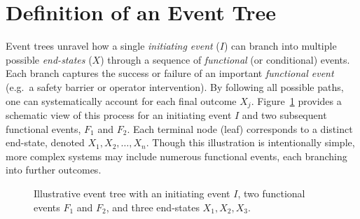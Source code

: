 \section{Definition of an Event Tree}
\label{sec:event_tree_definition}

Event trees unravel how a single \emph{initiating event} (\(I\)) can branch into multiple possible \emph{end-states} (\(X\)) through a sequence of \emph{functional} (or conditional) events. Each branch captures the success or failure of an important \emph{functional event} (e.g.\ a safety barrier or operator intervention). By following all possible paths, one can systematically account for each final outcome \(X_j\). Figure~\ref{fig:event_tree_example} provides a schematic view of this process for an initiating event \(I\) and two subsequent functional events, \(F_1\) and \(F_2\). Each terminal node (leaf) corresponds to a distinct end-state, denoted \(X_1, X_2, \ldots, X_n\). Though this illustration is intentionally simple, more complex systems may include numerous functional events, each branching into further outcomes.

\begin{figure}[ht!]
\centering
{}
\caption{Illustrative event tree with an initiating event \(I\), two functional events \(F_1\) and \(F_2\), and three end-states \(X_1, X_2, X_3\).}
\label{fig:event_tree_example}
\end{figure}

